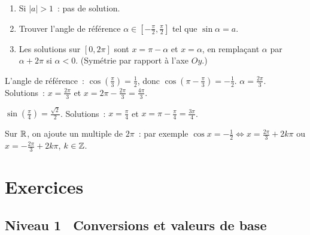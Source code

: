 \begin{methode}[R\'esoudre $\sin x = a$ sur {$[0, 2\pi]$}]
\begin{enumerate}
  \item Si $|a|>1$~: pas de solution.
  \item Trouver l'angle de r\'ef\'erence $\alpha\in[-\frac{\pi}{2},\frac{\pi}{2}]$ tel que $\sin\alpha=a$.
  \item Les solutions sur $[0,2\pi]$ sont $x=\pi-\alpha$ et $x=\alpha$,
        en rempla\c{c}ant $\alpha$ par $\alpha+2\pi$ si $\alpha<0$.
        (Sym\'etrie par rapport \`a l'axe $Oy$.)
\end{enumerate}
\end{methode}

\begin{ex}[R\'esoudre $\cos x = -\frac{1}{2}$ sur {$[0, 2\pi]$}]
L'angle de r\'ef\'erence~: $\cos(\frac{\pi}{3})=\frac{1}{2}$, donc $\cos(\pi-\frac{\pi}{3})=-\frac{1}{2}$.
$\alpha = \frac{2\pi}{3}$.
Solutions~: $x = \frac{2\pi}{3}$ et $x = 2\pi - \frac{2\pi}{3} = \frac{4\pi}{3}$.
\end{ex}

\begin{ex}[R\'esoudre $\sin x = \frac{\sqrt{2}}{2}$ sur {$[0, 2\pi]$}]
$\sin(\frac{\pi}{4})=\frac{\sqrt{2}}{2}$.
Solutions~: $x = \frac{\pi}{4}$ et $x = \pi - \frac{\pi}{4} = \frac{3\pi}{4}$.
\end{ex}

\begin{remarque}
\ExtensionTTen{} Sur $\mathbb{R}$, on ajoute un multiple de $2\pi$~: par exemple
$\cos x=-\frac12 \Leftrightarrow x=\frac{2\pi}{3}+2k\pi$ ou
$x=-\frac{2\pi}{3}+2k\pi$, $k\in\mathbb{Z}$.
\end{remarque}


\section{Exercices}

\subsection*{\quad Niveau 1 \textemdash\ Conversions et valeurs de base}

